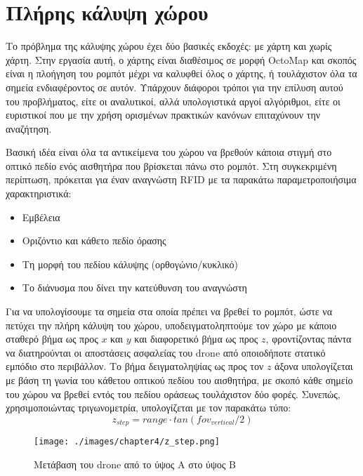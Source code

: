 \section{Πλήρης κάλυψη χώρου}
\label{section:coverage_impl}

Το πρόβλημα της κάλυψης χώρου έχει δύο βασικές εκδοχές: με χάρτη και χωρίς χάρτη. Στην εργασία αυτή, ο χάρτης είναι διαθέσιμος σε μορφή OctoMap και σκοπός είναι η πλοήγηση του ρομπότ μέχρι να καλυφθεί όλος ο χάρτης, ή τουλάχιστον όλα τα σημεία ενδιαφέροντος σε αυτόν. Υπάρχουν διάφοροι τρόποι για την επίλυση αυτού του προβλήματος, είτε οι αναλυτικοί, αλλά υπολογιστικά αργοί αλγόριθμοι, είτε οι ευριστικοί που με την χρήση ορισμένων πρακτικών κανόνων επιταχύνουν την αναζήτηση.

Βασική ιδέα είναι όλα τα αντικείμενα του χώρου να βρεθούν κάποια στιγμή στο οπτικό πεδίο ενός αισθητήρα που βρίσκεται πάνω στο ρομπότ. Στη συγκεκριμένη περίπτωση, πρόκειται για έναν αναγνώστη RFID με τα παρακάτω παραμετροποιήσιμα χαρακτηριστικά:
\begin{itemize}
    \item {Εμβέλεια}
    \item {Οριζόντιο και κάθετο πεδίο όρασης}
    \item {Τη μορφή του πεδίου κάλυψης (ορθογώνιο/κυκλικό)}
    \item {Το διάνυσμα που δίνει την κατεύθυνση του αναγνώστη}
\end{itemize}

Για να υπολογίσουμε τα σημεία στα οποία πρέπει να βρεθεί το ρομπότ, ώστε να πετύχει την πλήρη κάλυψη του χώρου, υποδειγματοληπτούμε τον χώρο με κάποιο σταθερό βήμα ως προς $x$ και $y$ και διαφορετικό βήμα ως προς $z$, φροντίζοντας πάντα να διατηρούνται οι αποστάσεις ασφαλείας του drone από οποιοδήποτε στατικό εμπόδιο στο περιβάλλον. Το βήμα δειγματοληψίας ως προς τον $z$ άξονα υπολογίζεται με βάση τη γωνία του κάθετου οπτικού πεδίου του αισθητήρα, με σκοπό κάθε σημείο του χώρου να βρεθεί εντός του πεδίου οράσεως τουλάχιστον δύο φορές. Συνεπώς, χρησιμοποιώντας τριγωνομετρία, υπολογίζεται με τον παρακάτω τύπο:
\begin{equation}
    z_{step} = range \cdot tan(fov_{vertical} / 2)
\end{equation}

\begin{figure}[!ht]
    \centering
    \texttt{[image: ./images/chapter4/z\_step.png]}
    \caption{Μετάβαση του drone από το ύψος Α στο ύψος Β}
    \label{fig:z_step}
\end{figure} 

